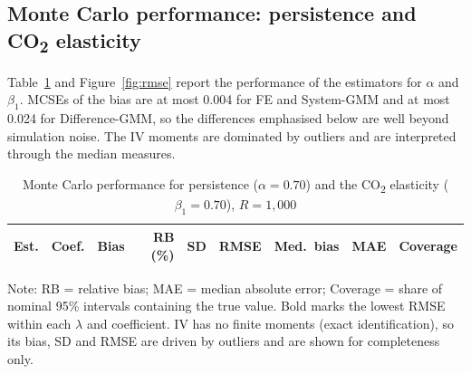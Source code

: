 \documentclass[11pt,a4paper]{article}
\newcommand{\COtwo}{CO\textsubscript{2}}
\begin{document}
\subsection{Monte Carlo performance: persistence and \COtwo{} elasticity}\label{sec:mc}

Table~\ref{tab:perf} and Figure~\ref{fig:rmse} report the performance of the estimators for $\alpha$ and $\beta_1$. MCSEs of the bias are at most 0.004 for FE and System-GMM and at most 0.024 for Difference-GMM, so the differences emphasised below are well beyond simulation noise. The IV moments are dominated by outliers and are interpreted through the median measures.

\begin{table}[htbp]
\centering
\begin{threeparttable}
\caption{Monte Carlo performance for persistence ($\alpha=0.70$) and the \COtwo{} elasticity ($\beta_1=0.70$), $R=1{,}000$}\label{tab:perf}
\scriptsize
\setlength{\tabcolsep}{4pt}
\begin{tabular}{@{}llrrrrrrr@{}}
\toprule
Est. & Coef. & Bias & RB (\%) & SD & RMSE & Med.\ bias & MAE & Coverage \\
\midrule
\bottomrule
\end{tabular}
\begin{tablenotes}\footnotesize
\item Note: RB = relative bias; MAE = median absolute error; Coverage = share of nominal 95\% intervals containing the true value. Bold marks the lowest RMSE within each $\lambda$ and coefficient. IV has no finite moments (exact identification), so its bias, SD and RMSE are driven by outliers and are shown for completeness only.
\end{tablenotes}
\end{threeparttable}
\end{table}
\end{document}
